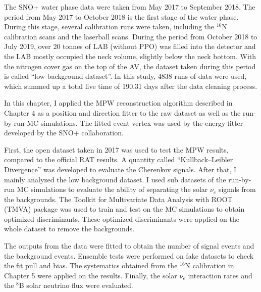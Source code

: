 
The SNO+ water phase data were taken from May 2017 to September 2018. The period from May 2017 to October 2018 is the first stage of the water phase. During this stage, several calibration runs were taken, including the $^{16}$N calibration scans and the laserball scans. During the period from October 2018 to July 2019, over 20 tonnes of LAB (without PPO) was filled into the detector and the LAB mostly occupied the neck volume, slightly below the neck bottom. With the nitrogen cover gas on the top of the AV, the dataset taken during this period is called ``low background dataset''. In this study, 4838 runs of data were used, which summed up a total live time of 190.31 days after the data cleaning process.
 
In this chapter, I applied the MPW reconstruction algorithm described in Chapter 4 as a position and direction fitter to the raw dataset as well as the run-by-run MC simulations. The fitted event vertex was used by the energy fitter developed by the SNO+ collaboration.  

First, the open dataset taken in 2017 was used to test the MPW results, compared to the official RAT results. A quantity called ``Kullback–Leibler Divergence'' was developed to evaluate the Cherenkov signals. After that, I mainly analyzed the low background dataset. I used sub datasets of the run-by-run MC simulations to evaluate the ability of separating the solar $\nu_e$ signals from the backgrounds. The Toolkit for Multivariate Data Analysis with ROOT (TMVA) package \cite{tmvaWebsite,albertsson2007tmva} was used to train and test on the MC simulations to obtain optimized discriminants. These optimized discriminants were applied on the whole dataset to remove the backgrounds.

The outputs from the data were fitted to obtain the number of signal events and the background events. Ensemble tests were performed on fake datasets to check the fit pull and bias. The systematics obtained from the $^{16}$N calibration in Chapter 5 were applied on the results. Finally, the solar $\nu_e$ interaction rates and the $^8$B solar neutrino flux were evaluated.


